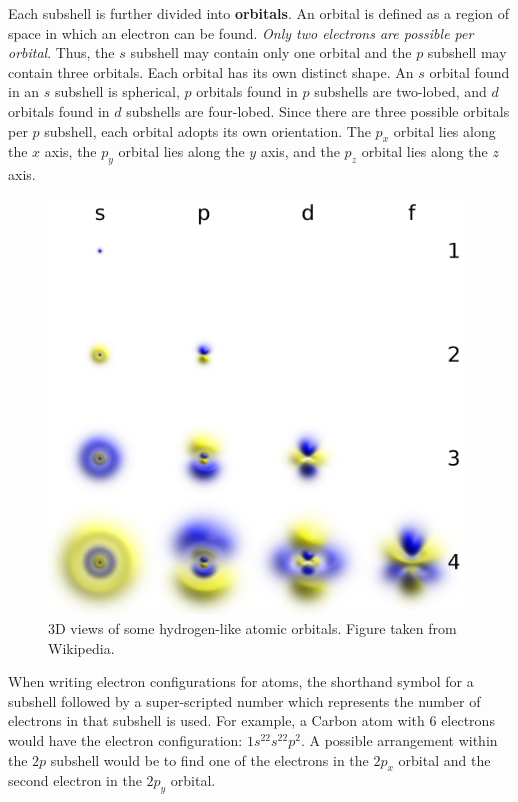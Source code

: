 \documentclass[a4paper,10pt]{article}
\begin{document}
{\noindent}Each subshell is further divided into \textbf{orbitals}. An orbital is defined as a region of space in which an electron can be found. \textit{Only two electrons are possible per orbital}. Thus, the $s$ subshell may contain only one orbital and the $p$ subshell may contain three orbitals. Each orbital has its own distinct shape. An $s$ orbital found in an $s$ subshell is spherical, $p$ orbitals found in $p$ subshells are two-lobed, and $d$ orbitals found in $d$ subshells are four-lobed. Since there are three possible orbitals per $p$ subshell, each orbital adopts its own orientation. The $p_x$ orbital lies along the $x$ axis, the $p_y$ orbital lies along the $y$ axis, and the $p_z$ orbital lies along the $z$ axis.

\begin{figure}[t]
    \centering
    \includegraphics[width=11cm]{figures/orbitals_3D.png}
    \caption{\footnotesize{3D views of some hydrogen-like atomic orbitals. Figure taken from Wikipedia.}}
    \label{fig:orbitals3D}
\end{figure}

{\noindent}When writing electron configurations for atoms, the shorthand symbol for a subshell followed by a super-scripted number which represents the number of electrons in that subshell is used. For example, a Carbon atom with $6$ electrons would have the electron configuration: $1s^22s^22p^2$. A possible arrangement within the $2p$ subshell would be to find one of the electrons in the $2p_x$ orbital and the second electron in the $2p_y$ orbital. 
\end{document}
